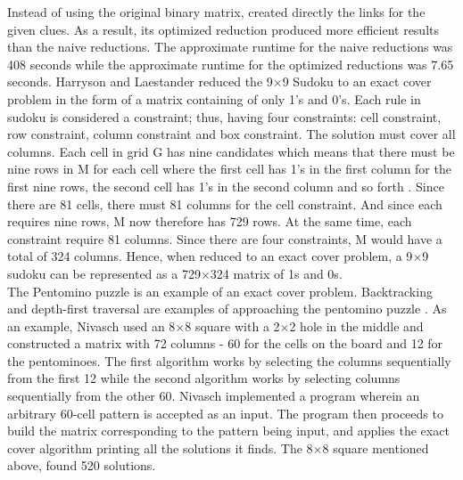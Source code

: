 \documentclass[a4paper,oneside,11pt]{report}
\newcounter{row}
\newcounter{col}
\begin{document}
	Instead of using the original binary matrix, \cite{Harrysson} created directly the links for the given clues. As a result, its optimized reduction produced more efficient results than the naive reductions. The approximate runtime for the naive reductions was 408 seconds while the approximate runtime for the optimized reductions was 7.65 seconds. Harryson and Laestander reduced the 9$\times$9 Sudoku to an exact cover problem in the form of a matrix containing of only 1’s and 0’s. Each rule in sudoku is considered a constraint; thus, having four constraints: cell constraint, row constraint, column constraint and box constraint. The solution must cover all columns. Each cell in grid G has nine candidates which means that there must be nine rows in M for each cell where the first cell has 1’s in the first column for the first nine rows, the second cell has 1’s in the second column and so forth \cite{Harrysson}. Since there are 81 cells, there must 81 columns for the cell constraint. And since each requires nine rows, M now therefore has 729 rows. At the same time, each constraint require 81 columns. Since there are four constraints, M would have a total of 324 columns. Hence, when reduced to an exact cover problem, a 9$\times$9 sudoku can be represented as a 729$\times$324 matrix of 1s and 0s.\\
	
		The Pentomino puzzle is an example of an exact cover problem. Backtracking and depth-first traversal are examples of approaching the pentomino puzzle \cite{Nivasch}. As an example, Nivasch used an 8$\times$8 square with a 2$\times$2 hole in the middle and constructed a matrix with 72 columns - 60 for the cells on the board and 12 for the pentominoes. The first algorithm works by selecting the columns sequentially from the first 12 while the second algorithm works by selecting columns sequentially from the other 60. Nivasch implemented a program wherein an arbitrary 60-cell pattern is accepted as an input. The program then proceeds to build the matrix corresponding to the pattern being input, and applies the exact cover algorithm printing all the solutions it finds. The 8$\times$8 square mentioned above, found 520 solutions.\\
		
\end{document}
